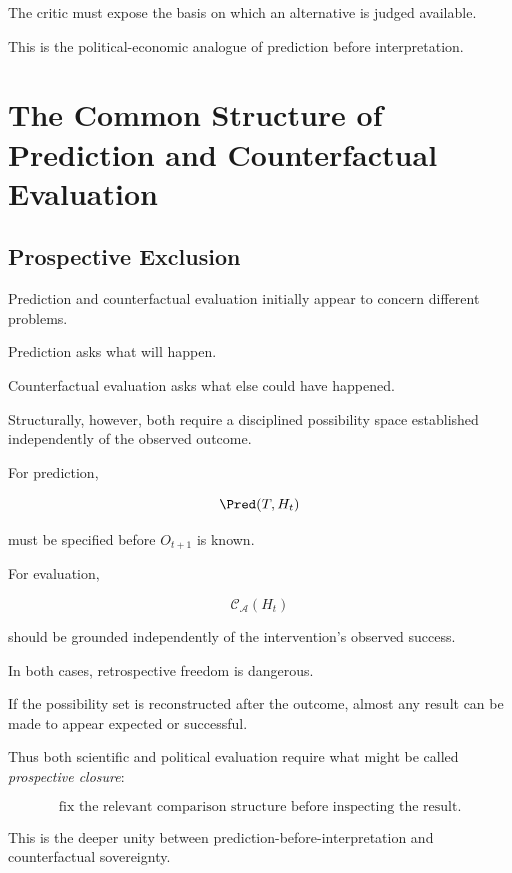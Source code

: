 \documentclass[11pt]{article}
\theoremstyle{remark}
\newcommand{\Adm}{\mathcal{A}}
\begin{document}
The critic must expose the basis on which an alternative is judged available.

This is the political-economic analogue of prediction before interpretation.

\section{The Common Structure of Prediction and Counterfactual Evaluation}

\subsection{Prospective Exclusion}

Prediction and counterfactual evaluation initially appear to concern different problems.

Prediction asks what will happen.

Counterfactual evaluation asks what else could have happened.

Structurally, however, both require a disciplined possibility space established independently of the observed outcome.

For prediction,

\begin{equation}
\Pred(T,H_t)
\end{equation}

must be specified before $O_{t+1}$ is known.

For evaluation,

\begin{equation}
\mathcal{C}_{\Adm}(H_t)
\end{equation}

should be grounded independently of the intervention's observed success.

In both cases, retrospective freedom is dangerous.

If the possibility set is reconstructed after the outcome, almost any result can be made to appear expected or successful.

Thus both scientific and political evaluation require what might be called \emph{prospective closure}:

\begin{equation}
\boxed{
\text{fix the relevant comparison structure before inspecting the result}.
}
\end{equation}

This is the deeper unity between prediction-before-interpretation and counterfactual sovereignty.
\end{document}

